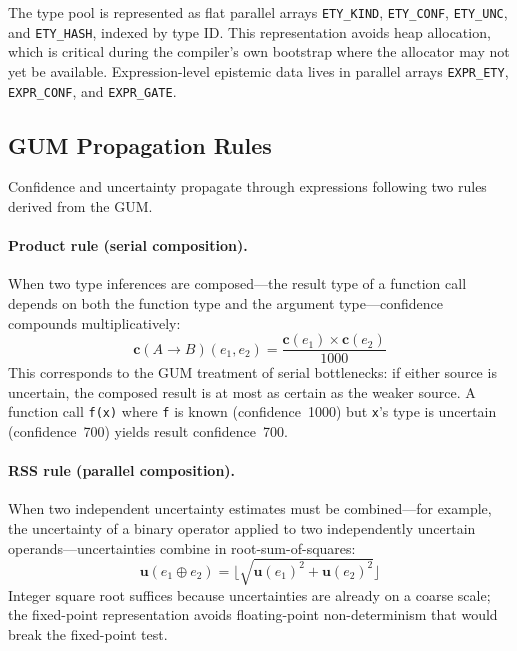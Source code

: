 \documentclass[acmsmall,screen,review,anonymous]{acmart}
\newcommand{\conf}[1]{\mathbf{c}(#1)}
\newcommand{\unc}[1]{\mathbf{u}(#1)}
\begin{document}
The type pool is represented as flat parallel arrays
\texttt{ETY\_KIND}, \texttt{ETY\_CONF}, \texttt{ETY\_UNC},
and \texttt{ETY\_HASH}, indexed by type ID.
This representation avoids heap allocation, which is critical during the
compiler's own bootstrap where the allocator may not yet be available.
Expression-level epistemic data lives in parallel arrays
\texttt{EXPR\_ETY}, \texttt{EXPR\_CONF}, and \texttt{EXPR\_GATE}.

\subsection{GUM Propagation Rules}

Confidence and uncertainty propagate through expressions following
two rules derived from the GUM.

\paragraph{Product rule (serial composition).}
When two type inferences are composed---the result type of a function
call depends on both the function type and the argument type---confidence
compounds multiplicatively:
\begin{equation}
\conf{A \to B}(e_1, e_2) = \frac{\conf{e_1} \times \conf{e_2}}{1000}
\label{eq:product}
\end{equation}
This corresponds to the GUM treatment of serial bottlenecks:
if either source is uncertain, the composed result is at most as
certain as the weaker source.
A function call \texttt{f(x)} where \texttt{f} is known (confidence~1000)
but \texttt{x}'s type is uncertain (confidence~700) yields result
confidence~700.

\paragraph{RSS rule (parallel composition).}
When two independent uncertainty estimates must be combined---for
example, the uncertainty of a binary operator applied to two independently
uncertain operands---uncertainties combine in root-sum-of-squares:
\begin{equation}
\unc{e_1 \oplus e_2} = \lfloor\sqrt{\unc{e_1}^2 + \unc{e_2}^2}\rfloor
\label{eq:rss}
\end{equation}
Integer square root suffices because uncertainties are already on a
coarse scale; the fixed-point representation avoids floating-point
non-determinism that would break the fixed-point test.
\end{document}
